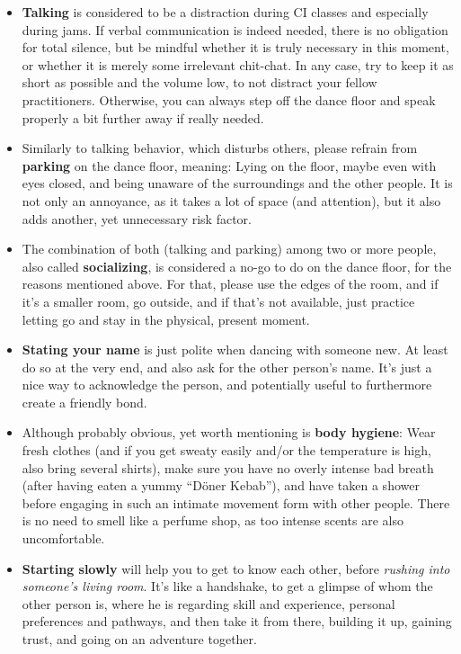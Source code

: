 \begin{itemize}
    \item \textbf{Talking} is considered to be a distraction during CI classes and especially during jams.
    If verbal communication is indeed needed, there is no obligation for total silence, but be mindful whether it is truly necessary in this moment, or whether it is merely some irrelevant chit-chat.
    In any case, try to keep it as short as possible and the volume low, to not distract your fellow practitioners.
    Otherwise, you can always step off the dance floor and speak properly a bit further away if really needed.
    \item Similarly to talking behavior, which disturbs others, please refrain from \textbf{parking} on the dance floor, meaning: Lying on the floor, maybe even with eyes closed, and being unaware of the surroundings and the other people.
    It is not only an annoyance, as it takes a lot of space (and attention), but it also adds another, yet unnecessary risk factor.
    \item The combination of both (talking and parking) among two or more people, also called \textbf{socializing}, is considered a no-go to do on the dance floor, for the reasons mentioned above.
    For that, please use the edges of the room, and if it's a smaller room, go outside, and if that's not available, just practice letting go and stay in the physical, present moment.
    \item \textbf{Stating your name} is just polite when dancing with someone new.
    At least do so at the very end, and also ask for the other person's name.
    It's just a nice way to acknowledge the person, and potentially useful to furthermore create a friendly bond.
    \item Although probably obvious, yet worth mentioning is \textbf{body hygiene}: Wear fresh clothes (and if you get sweaty easily and/or the temperature is high, also bring several shirts), make sure you have no overly intense bad breath (after having eaten a yummy ``Döner Kebab''), and have taken a shower before engaging in such an intimate movement form with other people.
    There is no need to smell like a perfume shop, as too intense scents are also uncomfortable.
    \item \textbf{Starting slowly} will help you to get to know each other, before \textit{rushing into someone's living room}.
    It's like a handshake, to get a glimpse of whom the other person is, where he is regarding skill and experience, personal preferences and pathways, and then take it from there, building it up, gaining trust, and going on an adventure together.

\end{itemize}
